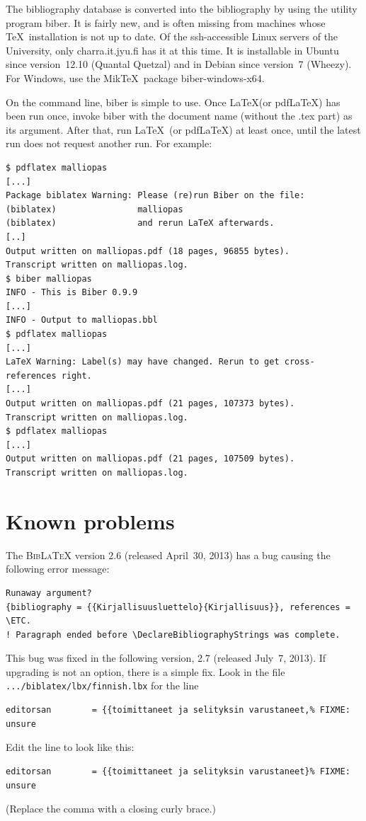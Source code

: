\documentclass[utf8,english]{gradu3}
\begin{document}
The bibliography database is converted into the bibliography by using
the utility program {biber}.  It is fairly new, and is often missing
from machines whose \TeX\ installation is not up to date.  Of the
ssh-accessible Linux servers of the University, only charra.it.jyu.fi
has it at this time.  It is installable in Ubuntu since version~12.10
(Quantal Quetzal) and in Debian since version~7 (Wheezy).  For
Windows, use the Mik\TeX\ package biber-windows-x64.

On the command line, biber is simple to use.  Once \LaTeX (or
pdf\LaTeX) has been run once, invoke biber with the document name
(without the .tex part) as its argument.  After that, run \LaTeX\ (or
pdf\LaTeX) at least once, until the latest run does not request
another run.  For example:

\begingroup\footnotesize
\begin{verbatim}
$ pdflatex malliopas
[...]
Package biblatex Warning: Please (re)run Biber on the file:
(biblatex)                malliopas
(biblatex)                and rerun LaTeX afterwards.
[..]
Output written on malliopas.pdf (18 pages, 96855 bytes).
Transcript written on malliopas.log.
$ biber malliopas
INFO - This is Biber 0.9.9
[...]
INFO - Output to malliopas.bbl
$ pdflatex malliopas
[...]
LaTeX Warning: Label(s) may have changed. Rerun to get cross-references right.
[...]
Output written on malliopas.pdf (21 pages, 107373 bytes).
Transcript written on malliopas.log.
$ pdflatex malliopas
[...]
Output written on malliopas.pdf (21 pages, 107509 bytes).
Transcript written on malliopas.log.
\end{verbatim}
\endgroup

\section{Known problems}

The \textsc{Bib\LaTeX} version 2.6 (released April~30, 2013) has a bug
causing the following error message:%
{\footnotesize%
\begin{verbatim}
Runaway argument?
{bibliography = {{Kirjallisuusluettelo}{Kirjallisuus}}, references = \ETC.
! Paragraph ended before \DeclareBibliographyStrings was complete.
\end{verbatim}
}%
This bug was fixed in the following version, 2.7 (released July~7,
2013).  If upgrading is not an option, there is a simple fix.  Look in
the file \texttt{.../biblatex/lbx/finnish.lbx} for the line
{\footnotesize%
\begin{verbatim}
editorsan        = {{toimittaneet ja selityksin varustaneet,% FIXME: unsure
\end{verbatim}
}%
Edit the line to look like this:
{\footnotesize%
\begin{verbatim}
editorsan        = {{toimittaneet ja selityksin varustaneet}% FIXME: unsure
\end{verbatim}
}%
(Replace the comma with a closing curly brace.)
\end{document}

